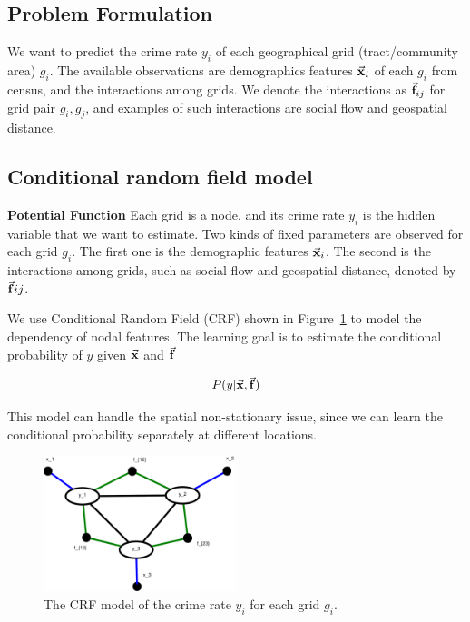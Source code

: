 \subsection{Problem Formulation}

We want to predict the crime rate $y_i$ of each geographical grid (tract/community area) $g_i$. The available observations are demographics features $\vec{\mathbf{x}}_i$ of each $g_i$ from census, and the interactions among grids. We denote the interactions as $\vec{\mathbf{f}}_{ij}$ for grid pair $g_i, g_j$, and examples of such interactions are social flow and geospatial distance.

\subsection{Conditional random field model}


\textbf{Potential Function}
Each grid is a node, and its crime rate $y_i$ is the hidden variable that we want to estimate. Two kinds of fixed parameters are observed for each grid $g_i$. The first one is the demographic features $\vec{\mathbf{x}}_i$. The second is the interactions among grids, such as social flow and geospatial distance, denoted by $\vec{\mathbf{f}}{ij}$.

We use Conditional Random Field (CRF) shown in Figure~\ref{fig:crf} to model the dependency of nodal features. The learning goal is to estimate the conditional probability of $y$ given $\vec{\mathbf{x}}$ and $\vec{\mathbf{f}}$

\begin{equation}
	P(y |  \vec{\mathbf{x}}, \vec{\mathbf{f}}) 
\end{equation}

This model can handle the spatial non-stationary issue, since we can learn the conditional probability separately at different locations.




\begin{figure}[hb]
	\centering
	\includegraphics[width=0.5\textwidth]{fig/CRF-fig.pdf}
	\caption{The CRF model of the crime rate $y_i$ for each grid $g_i$.}
	\label{fig:crf}
\end{figure}



